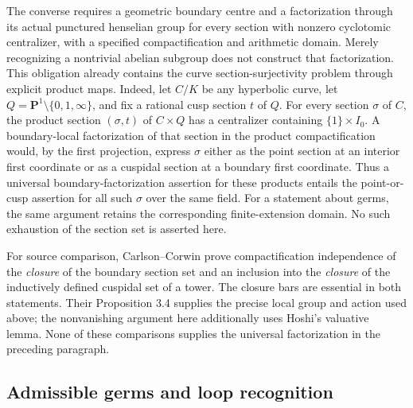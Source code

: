 \documentclass[11pt,a4paper]{article}
\begin{document}
The converse requires a geometric boundary centre and a factorization
through its actual punctured henselian group for every section with
nonzero cyclotomic centralizer, with a specified compactification and
arithmetic domain. Merely recognizing a nontrivial abelian subgroup
does not construct that factorization. This obligation already contains
the curve section-surjectivity problem through explicit product maps.
Indeed, let $C/K$ be any hyperbolic curve, let $Q=\mathbf
P^1\setminus\{0,1,\infty\}$, and fix a rational cusp section $t$ of
$Q$. For every section $\sigma$ of $C$, the product section
$(\sigma,t)$ of $C\times Q$ has a centralizer containing
$\{1\}\times I_0$. A boundary-local factorization of that section in
the product compactification would, by the first projection, express
$\sigma$ either as the point section at an interior first coordinate
or as a cuspidal section at a boundary first coordinate. Thus a
universal boundary-factorization assertion for these products entails
the point-or-cusp assertion for all such $\sigma$ over the same field.
For a statement about germs, the same argument retains the corresponding
finite-extension domain. No such exhaustion of the section set is
asserted here.

For source comparison, Carlson--Corwin
\cite[Theorem 3.7 and Proposition 4.12]{B_CarlsonCorwin2026} prove
compactification independence of the \emph{closure} of the boundary
section set and an inclusion into the \emph{closure} of the inductively
defined cuspidal set of a tower. The closure bars are essential in both
statements. Their Proposition 3.4 supplies the precise local group and
action used above; the nonvanishing argument here additionally uses
Hoshi's valuative lemma. None of these comparisons supplies the
universal factorization in the preceding paragraph.

\subsection{Admissible germs and loop recognition}
\end{document}
